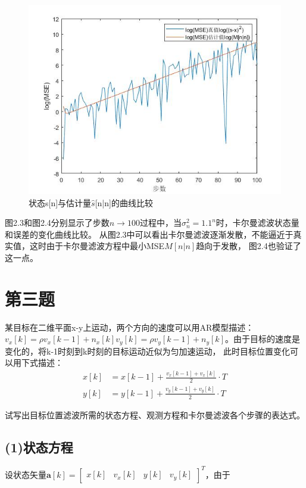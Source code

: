 \documentclass[fontset=windows]{article}
\numberwithin{figure}{section}
\begin{document}
\begin{figure}[H]
    \centering
    \includegraphics[scale=0.5]{2_4.jpg}
    \caption{状态s[n]与估计量\(\hat{s}\)[n|n]的曲线比较}
    \label{2.4}
\end{figure}

图2.3和图2.4分别显示了步数\(n\to 100\)过程中，当\(\sigma_n^2=1.1^n\)时，卡尔曼滤波状态量和误差的变化曲线比较。
从图2.3中可以看出卡尔曼滤波逐渐发散，不能逼近于真实值，这时由于卡尔曼滤波方程中最小MSE\(M[n|n]\)趋向于发散，
图2.4也验证了这一点。

\section{第三题}
某目标在二维平面x-y上运动，两个方向的速度可以用AR模型描述：\(v_x[k]=\rho v_x[k-1]+n_x[k]
v_y[k]=\rho v_y[k-1]+n_y[k]\)。由于目标的速度是变化的，将k-1时刻到k时刻的目标运动近似为匀加速运动，
此时目标位置变化可以用下式描述：
\begin{align*}
    x[k] & =x[k-1]+\frac{v_x[k-1]+v_x[k]}{2}\cdot T \\
    y[k] & =y[k-1]+\frac{v_y[k-1]+v_y[k]}{2}\cdot T
\end{align*}

试写出目标位置滤波所需的状态方程、观测方程和卡尔曼滤波各个步骤的表达式。

\subsection*{(1)状态方程}

设状态矢量\(\mathbf{a}[k]=\begin{bmatrix}
    x[k] & v_x[k] & y[k] & v_y[k]
\end{bmatrix}^T\)，由于
\end{document}
